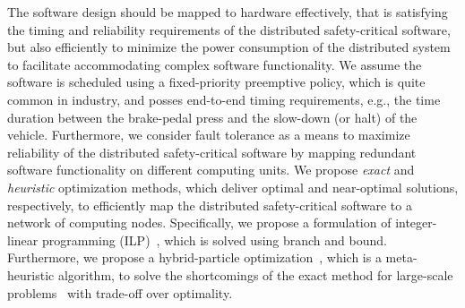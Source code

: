 The software design should be mapped to hardware effectively, that is satisfying the timing and reliability requirements of the distributed safety-critical software, but also efficiently to minimize the power consumption of the distributed system to facilitate accommodating complex software functionality. We assume the software is scheduled using a fixed-priority preemptive policy, which is quite common in industry, and posses end-to-end timing requirements, e.g., the time duration between the brake-pedal press and the slow-down (or halt) of the vehicle. Furthermore,  we consider fault tolerance as a means to maximize reliability of the distributed safety-critical software by mapping redundant software functionality on different computing units.  We propose  \textit{exact} and \textit{heuristic} optimization methods, which deliver optimal and near-optimal solutions, respectively, to efficiently map the distributed safety-critical software to a network of computing nodes. Specifically, we propose a formulation of integer-linear programming (ILP)~\cite{Mahmud5222}, which is solved using branch and bound. Furthermore, we propose a hybrid-particle optimization~\cite{Mirjalili2019ParticleOptimisation}, which is a meta-heuristic algorithm, to solve the shortcomings of the exact method for large-scale problems~\cite{Mahmud2019Power-awareOptimization} with trade-off over optimality.

